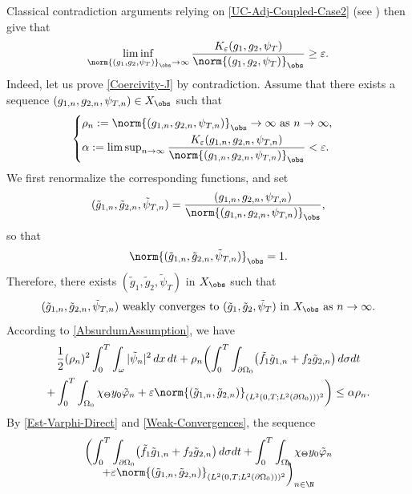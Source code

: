 Classical contradiction arguments relying on \eqref{UC-Adj-Coupled-Case2} (see \eg \cite{Ervedoza-Note-2020}) then give that
\begin{equation}
\label{Coercivity-J}
\liminf_{\norm{(g_1, g_2, \psi_T)}_{\obs} \to \infty} \frac{K_\varepsilon(g_1, g_2, \psi_T) }{\norm{(g_1, g_2, \psi_T)}_{\obs}} \geq \varepsilon.
\end{equation}
Indeed, let us prove \eqref{Coercivity-J} by contradiction. Assume that there exists a sequence $(g_{1,n}, g_{2,n}, \psi_{T,n}) \in X_{\obs}$ such that
\begin{equation}
\label{AbsurdumAssumption}
\begin{cases}
\rho_n := \norm{(g_{1,n}, g_{2,n}, \psi_{T,n})}_{\obs} \to \infty \text{ as } n \to \infty,\\[3pt]
\alpha:=\limsup_{n \to \infty} \dfrac{K_\varepsilon(g_{1,n}, g_{2,n}, \psi_{T,n})}{\norm{(g_{1,n}, g_{2,n}, \psi_{T,n})}_{\obs}} < \varepsilon.
\end{cases}
\end{equation}
We first renormalize the corresponding functions, and set
\[
(\tilde g_{1,n}, \tilde g_{2,n}, \tilde \psi_{T,n}) = \frac{(g_{1,n}, g_{2,n}, \psi_{T,n})}{ \norm{(g_{1,n}, g_{2,n}, \psi_{T,n})}_{\obs}},
\]
so that
\begin{equation}
\label{Bound-tilde-n}
\norm{(\tilde g_{1,n}, \tilde g_{2,n}, \tilde \psi_{T,n}) }_{\obs} = 1.
\end{equation}
Therefore, there exists $(\tilde g_1, \tilde g_2, \tilde \psi_T)$ in $X_{\obs}$ such that
\begin{equation}
\label{Weak-Convergences}
(\tilde g_{1,n}, \tilde g_{2,n}, \tilde \psi_{T,n}) \text{ weakly converges to }(\tilde g_1, \tilde g_2, \tilde \psi_T) \text{ in } X_{\obs} \text{ as } n \to \infty.
\end{equation}
According to \eqref{AbsurdumAssumption}, we have
\begin{multline}
\label{J-eps-expanded}
\frac{1}{2}(\rho_n)^2 \int_0^T \int_\omega |\tilde \psi_n|^2 \, dx\,dt
+
\rho_n
\biggl(
\int_0^T \int_{\partial \Omega_0} \bigl(\tilde f_1 \tilde g_{1,n} + f_2 \tilde g_{2,n} \bigr) \, d\sigma dt\\
+
\int_0^T \int_{\Omega_0} \chi_{\Theta} y_0 \tilde \varphi_n
+
\varepsilon { \norm{(\tilde g_{1,n}, \tilde g_{2,n})}_{(L^2(0,T; L^2(\partial\Omega_0)))^2}
}
\biggr)
\leq \alpha \rho_n.
\end{multline}
By \eqref{Est-Varphi-Direct} and \eqref{Weak-Convergences}, the sequence
\begin{multline*}
\biggl(
\int_0^T \int_{\partial \Omega_0} \bigl(\tilde f_1 \tilde g_{1,n} + f_2 \tilde g_{2,n} \bigr) \, d\sigma dt
+
\int_0^T \int_{\Omega_0} \chi_{\Theta} y_0 \tilde \varphi_n\\[-10pt]
+
\varepsilon
{ \norm{(\tilde g_{1,n}, \tilde g_{2,n})}_{(L^2(0,T; L^2(\partial\Omega_0)))^2}}
\biggr)_{n \in \N}
\end{multline*}
